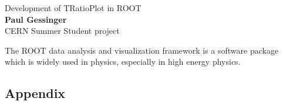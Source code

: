 \begin{centering} 
  \huge Development of TRatioPlot in ROOT \\ 
  \large \textbf{Paul Gessinger} \\ 
  \large CERN Summer Student project \\ 
\end{centering} 
\normalsize

\noindent The ROOT data analysis and visualization framework is a software package which
is widely used in physics, especially in high energy physics.

\clearpage

\begin{appendix}
  \section{Appendix}
  \printbibliography
\end{appendix}
